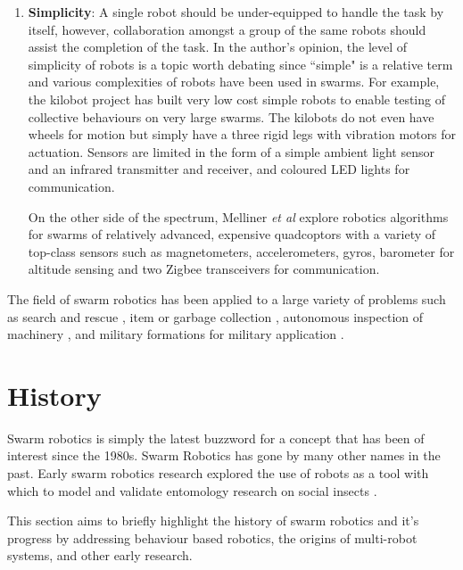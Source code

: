 \begin{enumerate}
\item \textbf{Simplicity}: A single robot should be under-equipped to handle the task by itself, however, collaboration amongst a group of the same robots should assist the completion of the task. In the author's opinion, the level of simplicity of robots is a topic worth debating since ``simple" is a relative term and various complexities of robots have been used in swarms. For example, the kilobot project \cite{rubenstein2012kilobot} has built very low cost simple robots to enable testing of collective behaviours on very large swarms. The kilobots do not even have wheels for motion but simply have a three rigid legs with vibration motors for actuation. Sensors are limited in the form of a simple ambient light sensor and an infrared transmitter and receiver, and coloured LED lights for communication. 

On the other side of the spectrum, Melliner \textit{et al} \cite{kushleyev2013towards, mellinger2013cooperative} explore robotics algorithms for swarms of relatively advanced, expensive quadcoptors with a variety of top-class sensors such as magnetometers, accelerometers, gyros, barometer for altitude sensing and two Zigbee transceivers for communication.
\end{enumerate}

 The field of swarm robotics has been applied to a large variety of problems such as search and rescue \cite{mondada2002search}, item or garbage collection \cite{balch1995io}, autonomous inspection of machinery \cite{correll2007challenging}, and military formations for military application \cite{balch1998behavior}.



\section{History}
\label{history}
 
Swarm robotics is simply the latest buzzword for a concept that has been of interest since the 1980s. Swarm Robotics has gone by many other names in the past. Early swarm robotics research explored the use of robots as a tool with which to model and validate entomology research on social insects \cite{dorigo2014swarm, beni1993swarm, seeley2009wisdom}.

This section aims to briefly highlight the history of swarm robotics and it's progress by addressing behaviour based robotics, the origins of multi-robot systems, and other early research.

